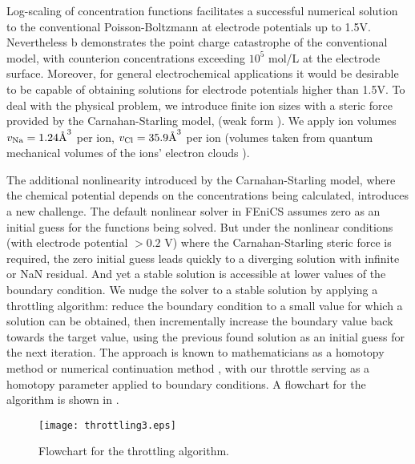 Log-scaling of concentration functions facilitates a successful numerical solution to
the conventional Poisson-Boltzmann at electrode potentials
up to 1.5V. Nevertheless b demonstrates the
point charge catastrophe of the conventional model, with counterion
concentrations exceeding $10^{5}$ mol/L at the electrode
surface. Moreover, for general electrochemical applications it would
be desirable to be capable of obtaining solutions for electrode
potentials higher than 1.5V. To deal with the physical problem, we
introduce finite ion sizes with a steric force provided by the
Carnahan-Starling model,  (weak form
).  We apply ion volumes
$v_{\ce{Na}}=1.24 \textrm{\AA}^{3}$ per  ion,
$v_{\ce{Cl}}=35.9 \textrm{\AA}^{3}$ per  ion (volumes taken from
quantum mechanical volumes of the ions' electron clouds
\cite{ParsonsNinham2009}).

The additional nonlinearity introduced by the Carnahan-Starling model,
where the chemical potential depends on the concentrations being
calculated, introduces a new challenge. The default nonlinear solver
in FEniCS assumes zero as an initial guess for the functions being
solved. But under the nonlinear conditions (with electrode potential
$>0.2$ V) where the Carnahan-Starling steric force is required, the
zero initial guess leads quickly to a diverging solution with infinite
or NaN
residual. And yet a stable solution is accessible at lower values of
the boundary condition. We nudge the solver to a stable solution by
applying a throttling algorithm: reduce the boundary condition to a
small value for which a solution can be obtained, then incrementally
increase the boundary value back towards the target value, using the
previous found solution as an initial guess for the next
iteration. The approach is known to mathematicians as a homotopy
method \cite{homotopy_analysis_Liao2012}
or numerical continuation method \cite{allgower1990numerical},
with our throttle serving as a homotopy parameter applied to boundary
conditions.  A flowchart for the algorithm is shown in
.

\begin{figure}
\centering
\texttt{[image: throttling3.eps]}
\caption{Flowchart for the throttling algorithm. }
\label{fig:throttling_algorithm}
\end{figure}


